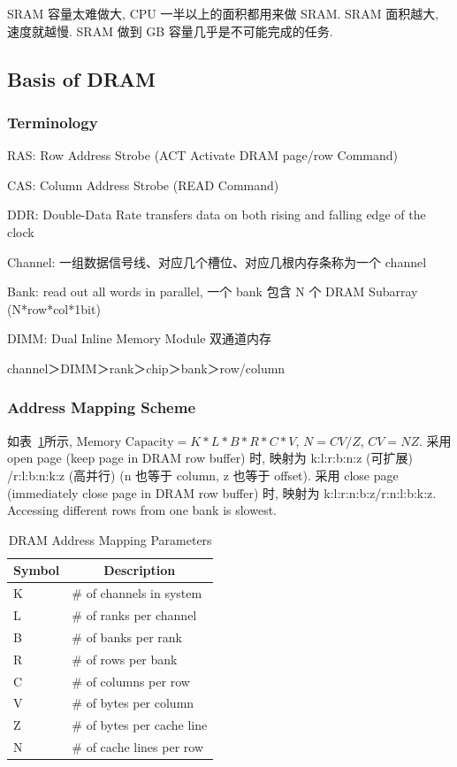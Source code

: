 \documentclass[UTF8,12pt,a4paper]{article}
\begin{document}
SRAM 容量太难做大, CPU 一半以上的面积都用来做 SRAM.
SRAM 面积越大, 速度就越慢.
SRAM 做到 GB 容量几乎是不可能完成的任务.

\subsection{Basis of DRAM}
\subsubsection{Terminology}
\begin{compactitem}
  \item RAS: Row Address Strobe (ACT Activate DRAM page/row Command)
  \item CAS: Column Address Strobe (READ Command)
  \item DDR: Double-Data Rate transfers data
  on both rising and falling edge of the clock
  \item Channel: 一组数据信号线、对应几个槽位、对应几根内存条称为一个 channel
  \item Bank: read out all words in parallel, 一个 bank 包含 N 个 DRAM Subarray (N*row*col*1bit)
  \item DIMM: Dual Inline Memory Module 双通道内存
  \item channel＞DIMM＞rank＞chip＞bank＞row/column
\end{compactitem}
\subsubsection{Address Mapping Scheme}
如表~\ref{tab:dram_address_mapping}所示,
$\text{Memory Capacity} = K*L*B*R*C*V$,
$N = CV/Z$, $CV = NZ$.
采用 open page (keep page in DRAM row buffer) 时,
映射为 k:l:r:b:n:z (可扩展) /r:l:b:n:k:z (高并行) (n 也等于 column, z 也等于 offset).
采用 close page (immediately close page in DRAM row buffer) 时,
映射为 k:l:r:n:b:z/r:n:l:b:k:z.
Accessing different rows from one bank is slowest.
\begin{table}
  \begin{small}
    \caption{DRAM Address Mapping Parameters}
    \label{tab:dram_address_mapping}
    \begin{center}
      \begin{tabular}[c]{l|l}
        \hline
        \multicolumn{1}{c|}{\textbf{Symbol}} & 
        \multicolumn{1}{c}{\textbf{Description}} \\
        \hline
        K & \# of channels in system \\
        L & \# of ranks per channel \\
        B & \# of banks per rank \\
        R & \# of rows per bank \\
        C & \# of columns per row \\
        V & \# of bytes per column \\
        Z & \# of bytes per cache line \\
        N & \# of cache lines per row \\
        \hline
      \end{tabular}
    \end{center}
  \end{small}
\end{table}
\end{document}
